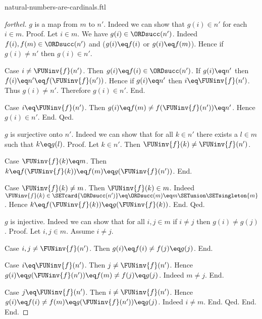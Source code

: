 \documentclass{naproche-library}
\begin{document}
\begin{smodule}[title=Natural Numbers are Cardinal Numbers]{natural-numbers-are-cardinals.ftl}
\begin{proof}[forthel]
      $g$ is a map from $m$ to $n'$.
      Indeed we can show that $g(i) \in n'$ for each $i \in m$. \newline
      Proof.
        Let $i \in m$.
        We have $g(i) \in \ORDsucc(n')$.
        Indeed $f(i), f(m) \in \ORDsucc(n')$ and ($g(i) \eq f(i)$ or $g(i) \eq f(m)$).
        Hence if $g(i) \neq n'$ then $g(i) \in n'$.

        Case $i \neq \FUNinv{f}(n')$.
          Then $g(i) \eq f(i) \in \ORDsucc(n')$.
          If $g(i) \eq n'$ then $f(i) \eq n' \eq f(\FUNinv{f}(n'))$.
          Hence if $g(i) \eq n'$ then $i \eq \FUNinv{f}(n')$.
          Thus $g(i) \neq n'$.
          Therefore $g(i) \in n'$.
        End.

        Case $i \eq \FUNinv{f}(n')$.
          Then $g(i)
            \eq f(m)
            \neq f(\FUNinv{f}(n'))
            \eq n'$.
          Hence $g(i) \in n'$.
        End.
      Qed.

      $g$ is surjective onto $n'$.
      Indeed we can show that for all $k \in n'$ there exists a $l \in m$ such that $k \eq g(l)$. \newline
      Proof.
        Let $k \in n'$.
        Then $\FUNinv{f}(k) \neq \FUNinv{f}(n')$.

        Case $\FUNinv{f}(k) \eq m$.
          Then $k
            \eq f(\FUNinv{f}(k))
            \eq f(m)
            \eq g(\FUNinv{f}(n'))$.
        End.

        Case $\FUNinv{f}(k) \neq m$.
          Then $\FUNinv{f}(k) \in m$.
          Indeed $\FUNinv{f}(k) \in \SETcard{\ORDsucc(n')} \eq \ORDsucc(m) \eq m \SETunion \SETsingleton{m}$.
          Hence $k
            \eq f(\FUNinv{f}(k))
            \eq g(\FUNinv{f}(k))$.
        End.
      Qed.

      $g$ is injective.
      Indeed we can show that for all $i, j \in m$ if $i \neq j$ then $g(i) \neq g(j)$. \newline
      Proof.
        Let $i, j \in m$.
        Assume $i \neq j$.

        Case $i, j \neq \FUNinv{f}(n')$.
          Then $g(i)
            \eq f(i)
            \neq f(j)
            \eq g(j)$.
        End.

        Case $i \eq \FUNinv{f}(n')$.
          Then $j \neq \FUNinv{f}(n')$.
          Hence $g(i)
            \eq g(\FUNinv{f}(n'))
            \eq f(m)
            \neq f(j)
            \eq g(j)$.
          Indeed $m \neq j$.
        End.

        Case $j \eq \FUNinv{f}(n')$.
          Then $i \neq \FUNinv{f}(n')$.
          Hence $g(i)
            \eq f(i)
            \neq f(m)
            \eq g(\FUNinv{f}(n'))
            \eq g(j)$.
          Indeed $i \neq m$.
        End.
      Qed.
    End.
  End.


\end{proof}
\end{smodule}
\end{document}
